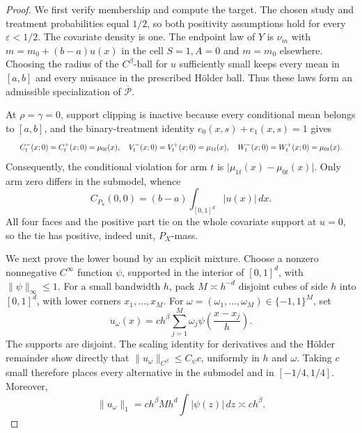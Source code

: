\documentclass{article}
\begin{document}
\begin{proof}
We first verify membership and compute the target. The chosen study and treatment probabilities equal \(1/2\), so both positivity assumptions hold for every \(\varepsilon<1/2\). The covariate density is one. The endpoint law of \(Y\) is \(\nu_m\) with \(m=m_0+(b-a)u(x)\) in the cell \(S=1,A=0\) and \(m=m_0\) elsewhere. Choosing the radius of the \(C^\beta\)-ball for \(u\) sufficiently small keeps every mean in \([a,b]\) and every nuisance in the prescribed Hölder ball. Thus these laws form an admissible specialization of \(\overline{\mathcal P}\).

At \(\rho=\gamma=0\), support clipping is inactive because every conditional mean belongs to \([a,b]\), and the binary-treatment identity \(e_0(x,s)+e_1(x,s)=1\) gives\[
\makebox[\linewidth][c]{\resizebox{0.98\linewidth}{!}{\par\noindent \makebox[\linewidth][c]{\resizebox{0.98\linewidth}{!}{\(\displaystyle \displaystyle C_t^-(x;0)=C_t^+(x;0)=\mu_{0t}(x),\quad V_t^-(x;0)=V_t^+(x;0)=\mu_{1t}(x),\quad W_t^-(x;0)=W_t^+(x;0)=\mu_{0t}(x).\)}}\par\noindent}}
\]Consequently, the conditional violation for arm \(t\) is \(\lvert\mu_{1t}(x)-\mu_{0t}(x)\rvert\). Only arm zero differs in the submodel, whence\[C_{P_u}(0,0)=(b-a)\int_{[0,1]^d}|u(x)|\,dx.\]All four faces and the positive part tie on the whole covariate support at \(u=0\), so the tie has positive, indeed unit, \(P_X\)-mass.

We next prove the lower bound by an explicit mixture. Choose a nonzero nonnegative \(C^\infty\) function \(\psi\), supported in the interior of \([0,1]^d\), with \(\lVert\psi\rVert_\infty\le1\). For a small bandwidth \(h\), pack \(M\asymp h^{-d}\) disjoint cubes of side \(h\) into \([0,1]^d\), with lower corners \(x_1,\ldots,x_M\). For \(\omega=(\omega_1,\ldots,\omega_M)\in\{-1,1\}^M\), set\[u_\omega(x)=c h^\beta\sum_{j=1}^M\omega_j\psi\!\left(\frac{x-x_j}{h}\right).\]The supports are disjoint. The scaling identity for derivatives and the Hölder remainder show directly that \(\lVert u_\omega\rVert_{C^\beta}\le C_\psi c\), uniformly in \(h\) and \(\omega\). Taking \(c\) small therefore places every alternative in the submodel and in \([-1/4,1/4]\). Moreover,\[\lVert u_\omega\rVert_1=c h^\beta M h^d\int|\psi(z)|\,dz\asymp c h^\beta.\]


\end{proof}
\end{document}
